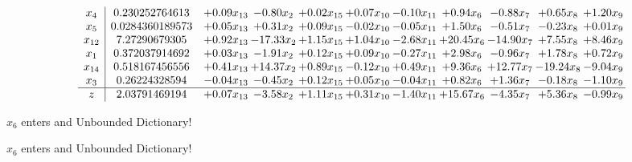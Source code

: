 \documentclass[9pt]{article}
\begin{document}
 \[\begin{array}{c| c c@{\hskip 2pt} c@{\hskip 2pt} c@{\hskip 2pt} c@{\hskip 2pt} c@{\hskip 2pt} c@{\hskip 2pt} c@{\hskip 2pt} c@{\hskip 2pt} c@{\hskip 2pt} }
 x_{4}   &  0.230252764613 & +  0.09 x_{13} & -0.80 x_{2} & +  0.02 x_{15} & +  0.07 x_{10} & -0.10 x_{11} & +  0.94 x_{6} & -0.88 x_{7} & +  0.65 x_{8} & +  1.20 x_{9}\\
 x_{5}   &  0.0284360189573 & +  0.05 x_{13} & +  0.31 x_{2} & +  0.09 x_{15} & -0.02 x_{10} & -0.05 x_{11} & +  1.50 x_{6} & -0.51 x_{7} & -0.23 x_{8} & +  0.01 x_{9}\\
 x_{12}   &  7.27290679305 & +  0.92 x_{13} & -17.33 x_{2} & +  1.15 x_{15} & +  1.04 x_{10} & -2.68 x_{11} & + 20.45 x_{6} & -14.90 x_{7} & +  7.55 x_{8} & +  8.46 x_{9}\\
 x_{1}   &  0.372037914692 & +  0.03 x_{13} & -1.91 x_{2} & +  0.12 x_{15} & +  0.09 x_{10} & -0.27 x_{11} & +  2.98 x_{6} & -0.96 x_{7} & +  1.78 x_{8} & +  0.72 x_{9}\\
 x_{14}   &  0.518167456556 & +  0.41 x_{13} & + 14.37 x_{2} & +  0.89 x_{15} & -0.12 x_{10} & +  0.49 x_{11} & +  9.36 x_{6} & + 12.77 x_{7} & -19.24 x_{8} & -9.04 x_{9}\\
 x_{3}   &  0.26224328594 & -0.04 x_{13} & -0.45 x_{2} & +  0.12 x_{15} & +  0.05 x_{10} & -0.04 x_{11} & +  0.82 x_{6} & +  1.36 x_{7} & -0.18 x_{8} & -1.10 x_{9}\\
\hline
z    &  2.03791469194 & +  0.07 x_{13} & -3.58 x_{2} & +  1.11 x_{15} & +  0.31 x_{10} & -1.40 x_{11} & + 15.67 x_{6} & -4.35 x_{7} & +  5.36 x_{8} & -0.99 x_{9}\\
\end{array}\]


 $ x_{6} $ enters and Unbounded Dictionary!


 $ x_{6} $ enters and Unbounded Dictionary!
\end{document}
